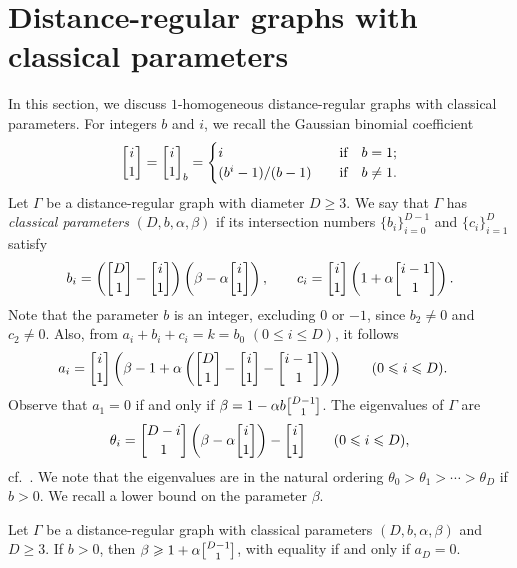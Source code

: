 \section{Distance-regular graphs with classical parameters}\label{sec:DRG-cp}
In this section, we discuss $1$-homogeneous distance-regular graphs with classical parameters.
For integers $b$ and $i$, we recall the Gaussian binomial coefficient
\begin{equation*}
	\genfrac{\lbrack}{\rbrack}{0pt}{}{i}{1}= \genfrac{\lbrack}{\rbrack}{0pt}{}{i}{1}_b 
	=\begin{cases} 
		i & \quad \text{if} \quad b = 1;\\
		(b^i-1)/(b-1) & \quad \text{if} \quad b\ne 1.
	\end{cases}
\end{equation*}
Let $\Gamma$ be a distance-regular graph with diameter $D \geqslant 3$.
We say that $\Gamma$ has \emph{classical parameters} $(D,b,\alpha, \beta)$ if its intersection numbers  $\{b_i\}^{D-1}_{i=0}$ and $\{c_i\}^D_{i=1}$ satisfy
\begin{equation}\label{clasic parameters}
	b_i = \left(\genfrac{\lbrack}{\rbrack}{0pt}{}{D}{1} -\genfrac{\lbrack}{\rbrack}{0pt}{}{i}{1}\right)\left(\beta -\alpha \genfrac{\lbrack}{\rbrack}{0pt}{}{i}{1}\right),
	\qquad 
	c_i = \genfrac{\lbrack}{\rbrack}{0pt}{}{i}{1}\left(1 + \alpha \genfrac{\lbrack}{\rbrack}{0pt}{}{i-1}{1}\right).
\end{equation}
Note that the parameter $b$ is an integer, excluding $0$ or $-1$, since $b_2 \neq 0$ and $c_2 \neq 0$. 
Also, from $a_i + b_i + c_i = k = b_0$ $(0 \leqslant i \leqslant D)$, it follows
\begin{align}
	a_i & = \genfrac{\lbrack}{\rbrack}{0pt}{}{i}{1}\left( \beta-1+\alpha\left( \genfrac{\lbrack}{\rbrack}{0pt}{}{D}{1}-\genfrac{\lbrack}{\rbrack}{0pt}{}{i}{1} - \genfrac{\lbrack}{\rbrack}{0pt}{}{i-1}{1} \right) \right) \qquad (0\leqslant i \leqslant D). \label{eq:formula ai}
\end{align}
Observe that $a_1=0$ if and only if $\beta = 1-\alpha b \genfrac{\lbrack}{\rbrack}{0pt}{}{D-1}{1}$.
The eigenvalues of $\Gamma$ are 
\begin{equation}\label{eq:eig CP}
	\theta_i = \genfrac{\lbrack}{\rbrack}{0pt}{}{D-i}{1}\left( \beta - \alpha \genfrac{\lbrack}{\rbrack}{0pt}{}{i}{1} \right) - \genfrac{\lbrack}{\rbrack}{0pt}{}{i}{1} \qquad (0\leqslant i \leqslant D),
\end{equation}
cf.~\cite[Corollary 8.4.2]{BCN}.
We note that the eigenvalues are in the natural ordering $\theta_0 > \theta_1> \cdots > \theta_D$ if $b>0$.
We recall a lower bound on the parameter $\beta$.
\begin{lemma}[{\cite[Proposition 1]{JV2017}}]\label{beta}
Let $\Gamma$ be a distance-regular graph with classical parameters $(D,b,\alpha, \beta)$ and $D \geqslant 3$. 
If $b > 0$, then $\beta \geqslant 1 +\alpha \genfrac{\lbrack}{\rbrack}{0pt}{}{D-1}{1}$, with equality if and only if $a_D=0$.
\end{lemma}


